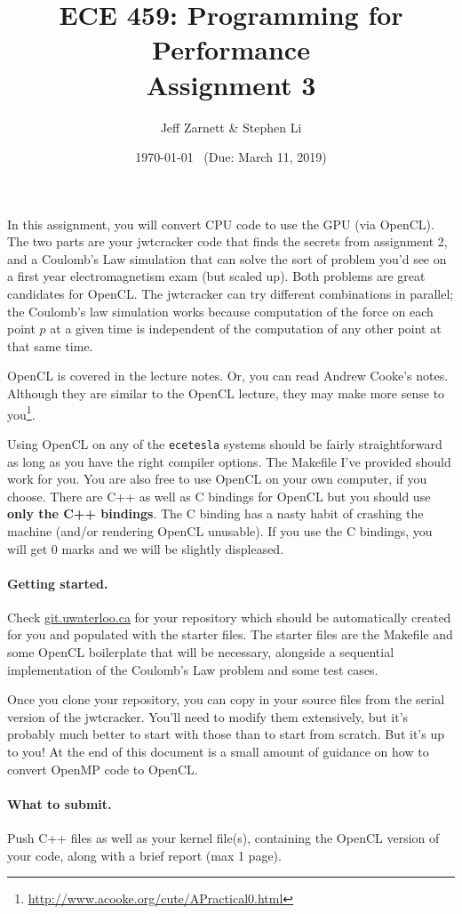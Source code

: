 \documentclass[letterpaper,10pt]{article}
\title{\bf ECE 459: Programming for Performance\\Assignment 3}
\author{Jeff Zarnett \& Stephen Li}
\date{\today ~ (Due: March 11, 2019)}
\begin{document}
\maketitle

In this assignment, you will convert CPU code to use the GPU (via OpenCL). 
The two parts are your jwtcracker code that finds the secrets
from assignment 2, and a Coulomb's Law  simulation that can solve the 
sort of problem you'd see on a first year electromagnetism exam (but scaled up).
Both problems are great candidates for OpenCL. The jwtcracker can try different
combinations in parallel; the Coulomb's law simulation works because computation
 of the force on each point $p$ at a given time is
independent of the computation of any other point at that same time. 

OpenCL is covered in the lecture notes. Or, you can read Andrew Cooke's notes. Although 
they are similar to the OpenCL lecture, they may make more sense to you\footnote{\url{http://www.acooke.org/cute/APractical0.html}}.

Using OpenCL on any of the \texttt{ecetesla} systems
 should be fairly straightforward as long as
you have the right compiler options. The Makefile I've provided
should work for you. You are also free to use OpenCL on your own
computer, if you choose. There are C++ as well as C bindings for OpenCL but you 
should use \textbf{only the C++ bindings}. The C binding has a nasty habit of 
crashing the machine (and/or rendering OpenCL unusable). If you use the C bindings, 
you will get 0 marks and we will be slightly displeased.

\paragraph{Getting started.} 
Check \url{git.uwaterloo.ca} for your repository which should 
be automatically created for you and populated with the starter files. The starter 
files are the Makefile and some OpenCL boilerplate that will be necessary, alongside 
a sequential implementation of the Coulomb's Law problem and some test cases.


Once you clone your repository, you can copy in your source files from 
the serial version of the jwtcracker.
You'll need to 
modify them extensively, but it's probably much better to start with those than to 
start from scratch. But it's up to you! At the end of this document is a small amount
of guidance on how to convert OpenMP code to OpenCL.

\paragraph{What to submit.} Push C++ files as well as your kernel file(s), containing 
the OpenCL version of your code, along with a brief report (max 1 page).
\end{document}
